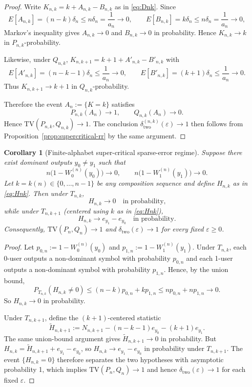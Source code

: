 \documentclass{article}
\newtheorem{corollary}[theorem]{Corollary}
\begin{document}
\begin{proof}
Write $K_{n,k} = k + A_{n,k} - B_{n,k}$ as in \eqref{eq:Dnk}. Since
\[
E[A_{n,k}] = (n-k)\delta_n \leq n\delta_n = \frac{1}{a_n} \to 0, \qquad E[B_{n,k}] = k\delta_n \leq n\delta_n = \frac{1}{a_n} \to 0,
\]
Markov's inequality gives $A_{n,k} \to 0$ and $B_{n,k} \to 0$ in probability. Hence $K_{n,k} \to k$ in $P_{n,k}$-probability.

Likewise, under $Q_{n,k}$, $K_{n,k+1} = k + 1 + A'_{n,k} - B'_{n,k}$ with
\[
E[A'_{n,k}] = (n-k-1)\delta_n \leq \frac{1}{a_n} \to 0, \qquad E[B'_{n,k}] = (k+1)\delta_n \leq \frac{1}{a_n} \to 0.
\]
Thus $K_{n,k+1} \to k+1$ in $Q_{n,k}$-probability.

Therefore the event $A_n := \{K = k\}$ satisfies
\[
P_{n,k}(A_n) \to 1,
\qquad
Q_{n,k}(A_n) \to 0.
\]
Hence $\mathrm{TV}(P_{n,k}, Q_{n,k}) \to 1$. The conclusion
$\delta^{(n,k)}_{\mathrm{two}}(\varepsilon) \to 1$ then follows from
Proposition~\ref{prop:supercritical-rr} by the same argument.
\end{proof}

\begin{corollary}[Finite-alphabet super-critical sparse-error regime]
\label{cor:supercritical-finite}
Suppose there exist dominant outputs $y_0 \neq y_1$ such that
\[
n\bigl(1 - W^{(n)}_0(y_0)\bigr) \to 0, \qquad n\bigl(1 - W^{(n)}_1(y_1)\bigr) \to 0.
\]
Let $k = k(n) \in \{0, \ldots, n-1\}$ be any composition sequence and define $H_{n,k}$ as in \eqref{eq:Hnk}. Then under $T_{n,k}$,
\[
H_{n,k} \to 0 \quad \text{in probability,}
\]
while under $T_{n,k+1}$ (centered using $k$ as in \eqref{eq:Hnk}),
\[
H_{n,k} \to e_{y_1} - e_{y_0} \quad \text{in probability.}
\]
Consequently, $\mathrm{TV}(P_n, Q_n) \to 1$ and $\delta_{\mathrm{two}}(\varepsilon) \to 1$ for every fixed $\varepsilon \geq 0$.
\end{corollary}

\begin{proof}
Let $p_{0,n} := 1 - W^{(n)}_0(y_0)$ and $p_{1,n} := 1 - W^{(n)}_1(y_1)$. Under $T_{n,k}$, each 0-user outputs a
non-dominant symbol with probability $p_{0,n}$ and each 1-user outputs a non-dominant symbol with
probability $p_{1,n}$. Hence, by the union bound,
\[
P_{T_{n,k}}(H_{n,k} \neq 0) \leq (n-k)p_{0,n} + k p_{1,n} \leq n p_{0,n} + n p_{1,n} \to 0.
\]
So $H_{n,k} \to 0$ in probability.

Under $T_{n,k+1}$, define the $(k+1)$-centered statistic
\[
\tilde{H}_{n,k+1} := N_{n,k+1} - (n-k-1)e_{y_0} - (k+1)e_{y_1}.
\]
The same union-bound argument gives $\tilde{H}_{n,k+1} \to 0$ in probability. But $H_{n,k} = \tilde{H}_{n,k+1} + e_{y_1} - e_{y_0}$,
so $H_{n,k} \to e_{y_1} - e_{y_0}$ in probability under $T_{n,k+1}$. The event $\{H_{n,k} = 0\}$ therefore separates the two
hypotheses with asymptotic probability 1, which implies $\mathrm{TV}(P_n, Q_n) \to 1$ and hence $\delta_{\mathrm{two}}(\varepsilon) \to 1$
for each fixed $\varepsilon$.
\end{proof}
\end{document}
